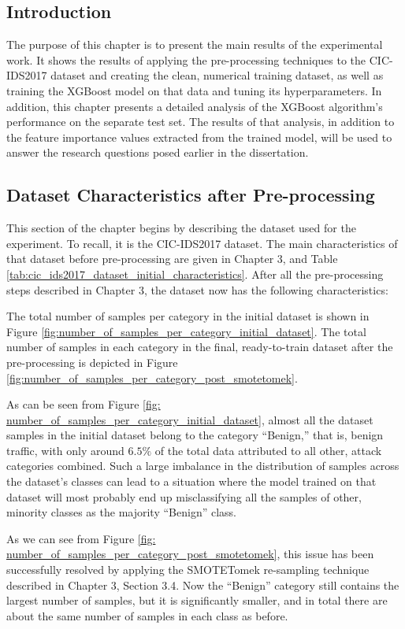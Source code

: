 \subsection{Introduction} 

The purpose of this chapter is to present the main results of the experimental work. It shows the results of applying the pre-processing techniques to the CIC-IDS2017 dataset and creating the clean, numerical training dataset, as well as training the XGBoost model on that data and tuning its hyperparameters. In addition, this chapter presents a detailed analysis of the XGBoost algorithm’s performance on the separate test set. The results of that analysis, in addition to the feature importance values extracted from the trained model, will be used to answer the research questions posed earlier in the dissertation.

\subsection{Dataset Characteristics after Pre-processing} 

This section of the chapter begins by describing the dataset used for the experiment. To recall, it is the CIC-IDS2017 dataset. The main characteristics of that dataset before pre-processing are given in Chapter 3, and Table \ref{tab:cic_ids2017_dataset_initial_characteristics}. After all the pre-processing steps described in Chapter 3, the dataset now has the following characteristics:

The total number of samples per category in the initial dataset is shown in Figure \ref{fig:number_of_samples_per_category_initial_dataset}. The total number of samples in each category in the final, ready-to-train dataset after the pre-processing is depicted in Figure \ref{fig:number_of_samples_per_category_post_smotetomek}.

As can be seen from Figure \ref{fig: number_of_samples_per_category_initial_dataset}, almost all the dataset samples in the initial dataset belong to the category “Benign,” that is, benign traffic, with only around $6.5\%$ of the total data attributed to all other, attack categories combined. Such a large imbalance in the distribution of samples across the dataset’s classes can lead to a situation where the model trained on that dataset will most probably end up misclassifying all the samples of other, minority classes as the majority “Benign” class.

As we can see from Figure \ref{fig: number_of_samples_per_category_post_smotetomek}, this issue has been successfully resolved by applying the SMOTETomek re-sampling technique described in Chapter 3, Section 3.4. Now the “Benign” category still contains the largest number of samples, but it is significantly smaller, and in total there are about the same number of samples in each class as before.

